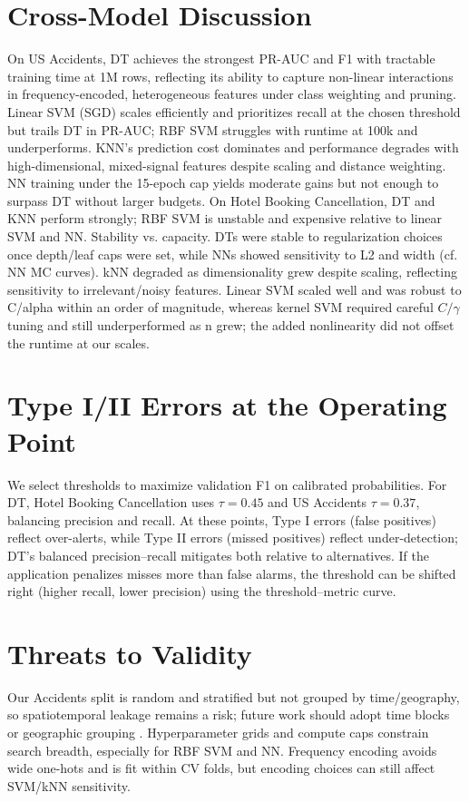 \documentclass[conference]{IEEEtran}
\newcommand{\datasetA}{Hotel Booking Cancellation}
\newcommand{\datasetB}{US Accidents}
\begin{document}
\section{Cross-Model Discussion}
On \datasetB{}, DT achieves the strongest PR-AUC and F1 with tractable training time at 1M rows, reflecting its ability to capture non-linear interactions in frequency-encoded, heterogeneous features under class weighting and pruning. Linear SVM (SGD) scales efficiently and prioritizes recall at the chosen threshold but trails DT in PR-AUC; RBF SVM struggles with runtime at 100k and underperforms. KNN's prediction cost dominates and performance degrades with high-dimensional, mixed-signal features despite scaling and distance weighting. NN training under the 15-epoch cap yields moderate gains but not enough to surpass DT without larger budgets. On \datasetA{}, DT and KNN perform strongly; RBF SVM is unstable and expensive relative to linear SVM and NN. Stability vs. capacity. DTs were stable to regularization choices once depth/leaf caps were set, while NNs showed sensitivity to L2 and width (cf. NN MC curves). kNN degraded as dimensionality grew despite scaling, reflecting sensitivity to irrelevant/noisy features. Linear SVM scaled well and was robust to C/alpha within an order of magnitude, whereas kernel SVM required careful $C/\gamma$ tuning and still underperformed as n grew; the added nonlinearity did not offset the runtime at our scales.

\section{Type I/II Errors at the Operating Point}
We select thresholds to maximize validation F1 on calibrated probabilities. For DT, \datasetA{} uses $\tau\!=\!0.45$ and \datasetB{} $\tau\!=\!0.37$, balancing precision and recall. At these points, Type I errors (false positives) reflect over-alerts, while Type II errors (missed positives) reflect under-detection; DT's balanced precision–recall mitigates both relative to alternatives. If the application penalizes misses more than false alarms, the threshold can be shifted right (higher recall, lower precision) using the threshold–metric curve.

\section{Threats to Validity}
Our Accidents split is random and stratified but not grouped by time/geography, so spatiotemporal leakage remains a risk; future work should adopt time blocks or geographic grouping \cite{Roberts2017BlockedCV}. Hyperparameter grids and compute caps constrain search breadth, especially for RBF SVM and NN. Frequency encoding avoids wide one-hots and is fit within CV folds, but encoding choices can still affect SVM/kNN sensitivity.
\end{document}

